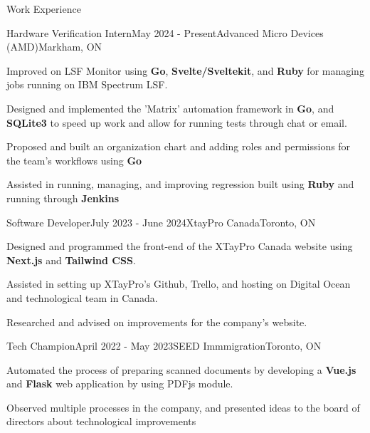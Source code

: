 \documentclass[
	11pt, %
]{resume} %
\begin{document}
\begin{rSection}{Work Experience}

	\begin{rSubsection}{Hardware Verification Intern}{May 2024 - Present}{Advanced Micro Devices (AMD)}{Markham, ON}
	\item Improved on LSF Monitor using \textbf{Go}, \textbf{Svelte/Sveltekit}, and \textbf{Ruby} for managing jobs running on IBM Spectrum LSF.
	\item Designed and implemented the 'Matrix' automation framework in \textbf{Go}, and \textbf{SQLite3} to speed up work and allow for running tests through chat or email.
	\item Proposed and built an organization chart and adding roles and permissions for the team's workflows using \textbf{Go}
	\item Assisted in running, managing, and improving regression built using \textbf{Ruby} and running through \textbf{Jenkins}
	\end{rSubsection}


	\begin{rSubsection}{Software Developer}{July 2023 - June 2024}{XtayPro Canada}{Toronto, ON}
		\item Designed and programmed the front-end of the XTayPro Canada website using \textbf{Next.js} and \textbf{Tailwind CSS}.
		\item Assisted in setting up XTayPro's Github, Trello, and hosting on Digital Ocean and technological team in Canada.
		\item Researched and advised on improvements for the company's website.
	\end{rSubsection}


	\begin{rSubsection}{Tech Champion}{April 2022 - May 2023}{SEED Immmigration}{Toronto, ON}
		\item Automated the process of preparing scanned documents by developing a \textbf{Vue.js} and \textbf{Flask} web application by using PDFjs module.
		\item Observed multiple processes in the company, and presented ideas to the board of directors about technological improvements
	\end{rSubsection}



\end{rSection}
\end{document}
